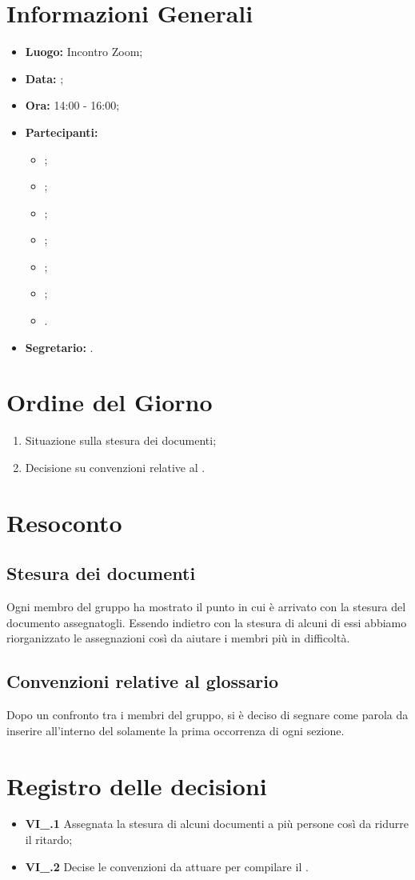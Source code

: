 \section{Informazioni Generali}
\begin{itemize}
\item \textbf{Luogo:} Incontro Zoom;
\item \textbf{Data:} \Data;
\item \textbf{Ora:} 14:00 - 16:00;
\item \textbf{Partecipanti:}
	\begin{itemize}
		\item \BL{}; 
		\item \FF{};
		\item \MM{}; 
		\item \PC{};
		\item \TG{};
		\item \TL{};
		\item \VD{}.
	\end{itemize} 
\item \textbf{Segretario:} \PC{}.
\end{itemize}

\section{Ordine del Giorno}
\begin{enumerate}
 \item Situazione sulla stesura dei documenti;
 \item Decisione su convenzioni relative al \Glossario.
\end{enumerate}

\section{Resoconto}
\subsection{Stesura dei documenti}
Ogni membro del gruppo ha mostrato il punto in cui è arrivato con la stesura del documento assegnatogli. Essendo indietro con la stesura di alcuni di essi abbiamo riorganizzato le assegnazioni così da aiutare i membri più in difficoltà.
\subsection{Convenzioni relative al glossario}
Dopo un confronto tra i membri del gruppo, si è deciso di segnare come parola da inserire all'interno del \Glossario solamente la prima occorrenza di ogni sezione.

\section{Registro delle decisioni}
\begin{itemize}
  \item \textbf{VI\_\Data.1} Assegnata la stesura di alcuni documenti a più persone così da ridurre il ritardo;
  \item \textbf{VI\_\Data.2} Decise le convenzioni da attuare per compilare il \Glossario.
\end{itemize}